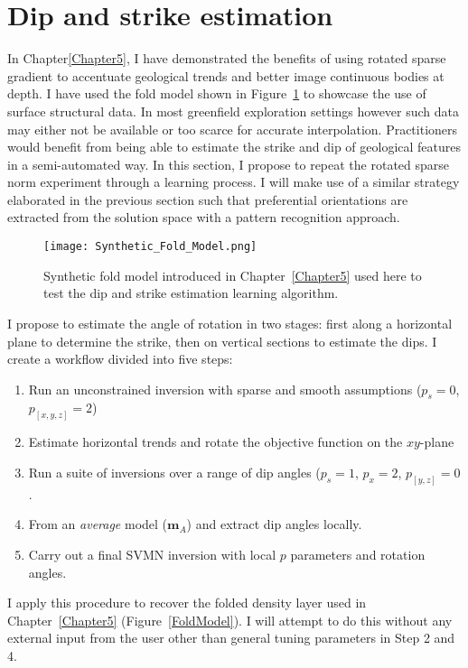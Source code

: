 \section{Dip and strike estimation}
In Chapter\ref{Chapter5}, I have demonstrated the benefits of using rotated sparse gradient to accentuate geological trends and better image continuous bodies at depth. I have used the fold model shown in Figure~\ref{FoldModel_DipStrikeEst} to showcase the use of surface structural data. In most greenfield exploration settings however such data may either not be available or too scarce for accurate interpolation. Practitioners would benefit from being able to estimate the strike and dip of geological features in a semi-automated way.
In this section, I propose to repeat the rotated sparse norm experiment through a learning process. I will make use of a similar strategy elaborated in the previous section such that preferential orientations are extracted from the solution space with a pattern recognition approach.

\begin{figure}\centering
\texttt{[image: Synthetic\_Fold\_Model.png]}
\caption{Synthetic fold model introduced in Chapter~\ref{Chapter5} used here to test the dip and strike estimation learning algorithm.}
\label{FoldModel_DipStrikeEst}
\end{figure}


I propose to estimate the angle of rotation in two stages: first along a horizontal plane to determine the strike, then on vertical sections to estimate the dips. I create a workflow divided into five steps:
\begin{enumerate}
\item Run an unconstrained inversion with sparse and smooth assumptions ($p_s=0$, $p_{[x,y,z]}=2$)
\item Estimate horizontal trends and rotate the objective function on the $xy$-plane
\item Run a suite of inversions over a range of dip angles ($p_s=1$, $p_x=2$, $p_{[y,z]}=0$.
\item From an \emph{average} model ($\mathbf{m}_A$) and extract dip angles locally.
\item Carry out a final SVMN inversion with local $p$ parameters and rotation angles.
\end{enumerate}
I apply this procedure to recover the folded density layer used in Chapter~\ref{Chapter5} (Figure~\ref{FoldModel}).
I will attempt to do this without any external input from the user other than general tuning parameters in Step 2 and 4.

